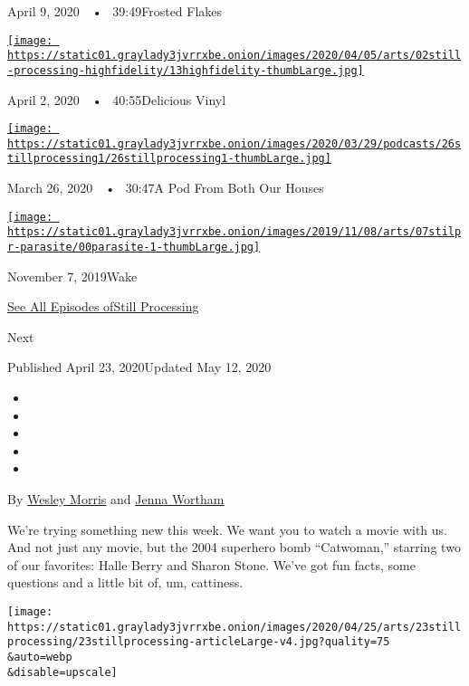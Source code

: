 April 9, 2020~~•~ 39:49Frosted Flakes

\href{https://www.nytimes3xbfgragh.onion/2020/04/02/podcasts/high-fidelity-zoe-kravitz.html?action=click\&module=audio-series-bar\&region=header\&pgtype=Article}{\texttt{[image: https://static01.graylady3jvrrxbe.onion/images/2020/04/05/arts/02still-processing-highfidelity/13highfidelity-thumbLarge.jpg]}}

April 2, 2020~~•~ 40:55Delicious Vinyl

\href{https://www.nytimes3xbfgragh.onion/2020/03/26/podcasts/still-processing-quarantine.html?action=click\&module=audio-series-bar\&region=header\&pgtype=Article}{\texttt{[image: https://static01.graylady3jvrrxbe.onion/images/2020/03/29/podcasts/26stillprocessing1/26stillprocessing1-thumbLarge.jpg]}}

March 26, 2020~~•~ 30:47A Pod From Both Our Houses

\href{https://www.nytimes3xbfgragh.onion/2019/11/07/podcasts/still-processing-parasite-watchmen-bong-joon-ho.html?action=click\&module=audio-series-bar\&region=header\&pgtype=Article}{\texttt{[image: https://static01.graylady3jvrrxbe.onion/images/2019/11/08/arts/07stilpr-parasite/00parasite-1-thumbLarge.jpg]}}

November 7, 2019Wake

\href{https://www.nytimes3xbfgragh.onion/column/still-processing-podcast}{See
All Episodes ofStill Processing}

Next

Published April 23, 2020Updated May 12, 2020

\begin{itemize}
\item
\item
\item
\item
\item
\end{itemize}

By \href{https://www.nytimes3xbfgragh.onion/by/wesley-morris}{Wesley
Morris} and
\href{https://www.nytimes3xbfgragh.onion/by/jenna-wortham}{Jenna
Wortham}

We're trying something new this week. We want you to watch a movie with
us. And not just any movie, but the 2004 superhero bomb ``Catwoman,''
starring two of our favorites: Halle Berry and Sharon Stone. We've got
fun facts, some questions and a little bit of, um, cattiness.

\texttt{[image: https://static01.graylady3jvrrxbe.onion/images/2020/04/25/arts/23stillprocessing/23stillprocessing-articleLarge-v4.jpg?quality=75\\\&auto=webp\\\&disable=upscale]}

